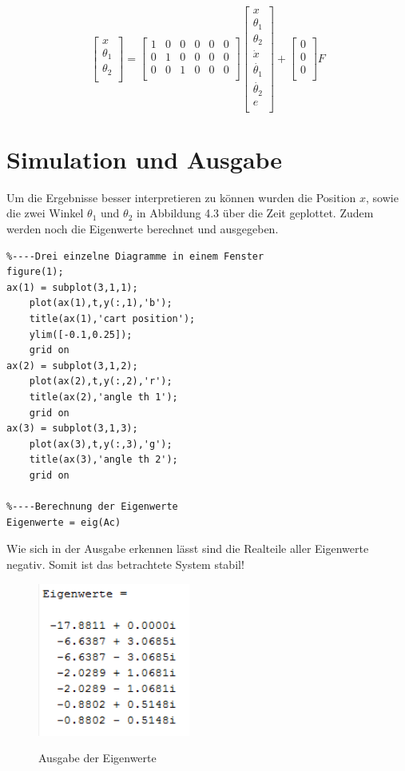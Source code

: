 \documentclass[a4paper, 10pt]{report}
\begin{document}
\begin{equation*}
\begin{bmatrix}
x\\
\theta_{1}\\
\theta_{2}\\
\end{bmatrix}
=
\begin{bmatrix}
1 & 0 & 0 & 0 & 0 & 0 \\
0 & 1 & 0 & 0 & 0 & 0 \\
0 & 0 & 1 & 0 & 0 & 0 \\
\end{bmatrix}
\begin{bmatrix}
x \\
\theta_{1}\\
\theta_{2}\\
\dot{x}\\
\dot{\theta_{1}}\\
\dot{\theta_{2}}\\
e\\
\end{bmatrix}
+
\begin{bmatrix}
0 \\
0 \\
0 \\
\end{bmatrix}
F
\end{equation*}

\section{Simulation und Ausgabe}
Um die Ergebnisse besser interpretieren zu können wurden die Position $x$, sowie die zwei Winkel $\theta_{1}$ und $\theta_{2}$ in Abbildung 4.3 über die Zeit geplottet. Zudem werden noch die Eigenwerte berechnet und ausgegeben.  
\begin{lstlisting}
%----Drei einzelne Diagramme in einem Fenster
figure(1);
ax(1) = subplot(3,1,1);
    plot(ax(1),t,y(:,1),'b');
    title(ax(1),'cart position'); 
    ylim([-0.1,0.25]);            
    grid on                       
ax(2) = subplot(3,1,2);           
    plot(ax(2),t,y(:,2),'r');     
    title(ax(2),'angle th 1');
    grid on
ax(3) = subplot(3,1,3);
    plot(ax(3),t,y(:,3),'g');
    title(ax(3),'angle th 2');
    grid on

%----Berechnung der Eigenwerte
Eigenwerte = eig(Ac)
\end{lstlisting}
Wie sich in der Ausgabe erkennen lässt sind die Realteile aller Eigenwerte negativ. Somit ist das betrachtete System stabil!
\begin{figure}[h]
\centering  %
{\includegraphics[width=5cm]{Eigenwerte}}
\caption{Ausgabe der Eigenwerte}
\end{figure}
\end{document}
